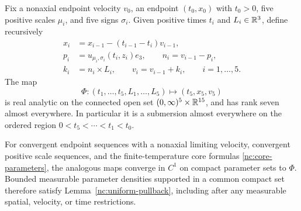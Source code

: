 \begin{lemma}
\label{lem:five-gain-rank}
Fix a nonaxial endpoint velocity \(v_0\), an endpoint
\((t_0,x_0)\) with \(t_0>0\), five positive scales
\(\mu_i\), and five signs \(\sigma_i\).
Given positive times \(t_i\) and \(L_i\in\mathbb R^3\), define recursively
\begin{equation}
\label{nc:rank-map}
 \begin{split}
 x_i&=x_{i-1}-(t_{i-1}-t_i)v_{i-1},\\
 p_i&=u_{\mu_i,\sigma_i}(t_i,z_i)e_3,\qquad
 n_i=v_{i-1}-p_i,\\
 k_i&=n_i\times L_i,\qquad v_i=v_{i-1}+k_i ,
 \qquad i=1,\ldots,5 .
 \end{split}
\end{equation}
The map
\[
 \Phi:(t_1,\ldots,t_5,L_1,\ldots,L_5)
       \longmapsto(t_5,x_5,v_5)
\]
is real analytic on the connected open set
\((0,\infty)^5\times\mathbb R^{15}\), and has rank seven almost everywhere.
In particular it is a submersion almost everywhere on the ordered
region \(0<t_5<\cdots<t_1<t_0\).

For convergent endpoint sequences with a nonaxial limiting velocity,
convergent positive scale sequences, and the finite-temperature
core formulas \eqref{nc:core-parameters}, the analogous maps converge
in \(C^1\) on compact parameter sets to \(\Phi\).
Bounded measurable parameter densities supported in a common
compact set therefore satisfy
Lemma~\ref{nc:uniform-pullback}, including after any measurable
spatial, velocity, or time restrictions.
\end{lemma}

